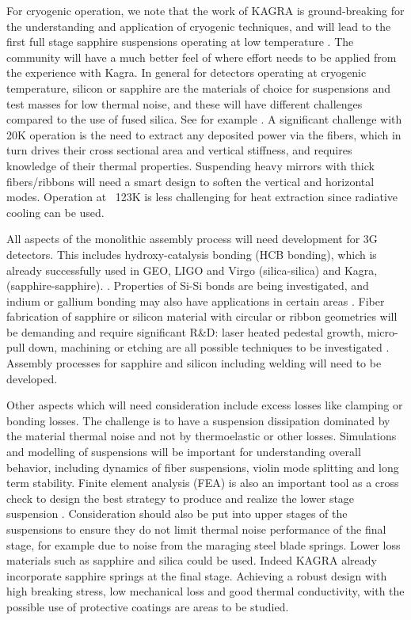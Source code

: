 For cryogenic operation, we note that the work of KAGRA is ground-breaking for the understanding and application of cryogenic techniques, and will lead to the first full stage sapphire suspensions operating at low temperature \cite{Kumar:2016_KAGRA}. The community will have a much better feel of where effort needs to be applied from the experience with Kagra.
In general for detectors operating at cryogenic temperature, silicon or sapphire are the materials of choice for suspensions and test masses for low thermal noise, and these will have different challenges compared to the use of fused silica. See for example \cite{Cumming:2014Silicon, nawrodt:2013,Haughian:2016, Alshourbagy:2006_thermoelastic, Alshourbagy:2006,amico:2004, Cumming:2014Silicon, Alshourbagy:2005}. A significant challenge with 20K operation is the need to extract any deposited power via the fibers, which in turn drives their cross sectional area and vertical stiffness, and requires knowledge of their thermal properties. Suspending heavy mirrors with thick fibers/ribbons will need a smart design to soften the vertical and horizontal modes. Operation at ~123K is less challenging for heat extraction since radiative cooling can be used.

All aspects of the monolithic assembly process will need development for 3G detectors. This includes hydroxy-catalysis bonding (HCB bonding), which is already successfully used in GEO, LIGO and Virgo (silica-silica) and Kagra, (sapphire-sapphire). \cite{dari:2010, Amico:2002, vanVeggel:2014, Haughian:2016}. Properties of Si-Si bonds are being investigated, and indium or gallium bonding may also have applications in certain areas \cite{Hofmann:2015, Murray:2015Low_Temp}.  Fiber fabrication of sapphire or silicon material with circular or ribbon geometries will be demanding and require significant R\&D: laser heated pedestal growth, micro-pull down, machining or etching are all possible techniques to be investigated \cite{Cumming:2014Silicon, Alshourbagy:2005}. Assembly processes for sapphire and silicon including welding will need to be developed.

Other aspects which will need consideration include excess losses like clamping or bonding losses. The challenge is to have a suspension dissipation dominated by the material thermal noise and not by thermoelastic or other losses.
Simulations and modelling of suspensions will be important for understanding overall behavior, including dynamics of fiber suspensions, violin mode splitting and long term stability. Finite element analysis (FEA) is also an important tool as a cross check to design the best strategy to produce and realize the lower stage suspension \cite{Lorenzini:2010, Sorazu2017Sus}.
Consideration should also be put into upper stages of the suspensions to ensure they do not limit thermal noise performance of the final stage, for example due to noise from the maraging steel blade springs. Lower loss materials such as sapphire and silica could be used. Indeed KAGRA already incorporate sapphire springs at the final stage. Achieving a robust design with high breaking stress, low mechanical loss and good thermal conductivity, with the possible use of protective coatings are areas to be studied. 

